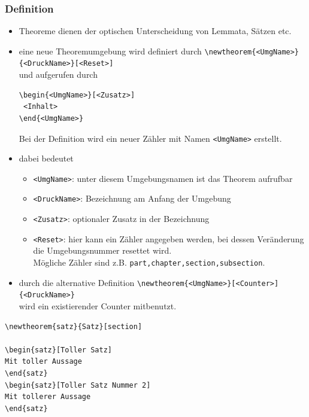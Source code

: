 \begin{frame}[fragile]
\frametitle{Definition}
\begin{itemize}[<+->]
  \item Theoreme dienen der optischen Unterscheidung von Lemmata, Sätzen etc.
  \item eine neue Theoremumgebung wird definiert durch
    \lstinline[style=Latex]+\newtheorem{<UmgName>}{<DruckName>}[<Reset>]+\\
    und aufgerufen durch
    \begin{lstlisting}[style=Latex]
\begin{<UmgName>}[<Zusatz>]
 <Inhalt>
\end{<UmgName>}
    \end{lstlisting}
    Bei der Definition wird ein neuer Zähler mit Namen \lstinline[style=Latex]+<UmgName>+ erstellt.
  \item dabei bedeutet
  \begin{itemize}
    \item \lstinline[style=Latex]+<UmgName>+: unter diesem Umgebungsnamen ist das Theorem aufrufbar
    \item \lstinline[style=Latex]+<DruckName>+: Bezeichnung am Anfang der Umgebung
    \item \lstinline[style=Latex]+<Zusatz>+: optionaler Zusatz in der Bezeichnung
    \item \lstinline[style=Latex]+<Reset>+: hier kann ein Zähler angegeben werden, bei dessen Veränderung die Umgebungsnummer resettet wird.\\
      Mögliche Zähler sind z.B. \texttt{part,chapter,section,subsection}.
  \end{itemize}
  \item durch die alternative Definition
  \lstinline[style=Latex]+\newtheorem{<UmgName>}[<Counter>]{<DruckName>}+\\
  wird ein existierender Counter mitbenutzt.
\end{itemize}
\end{frame}

\begin{frame}[fragile]
\begin{lstlisting}[style=Latex]
\newtheorem{satz}{Satz}[section]

\begin{satz}[Toller Satz]
Mit toller Aussage
\end{satz}
\begin{satz}[Toller Satz Nummer 2]
Mit tollerer Aussage
\end{satz}

\end{lstlisting}

{}

\end{frame}